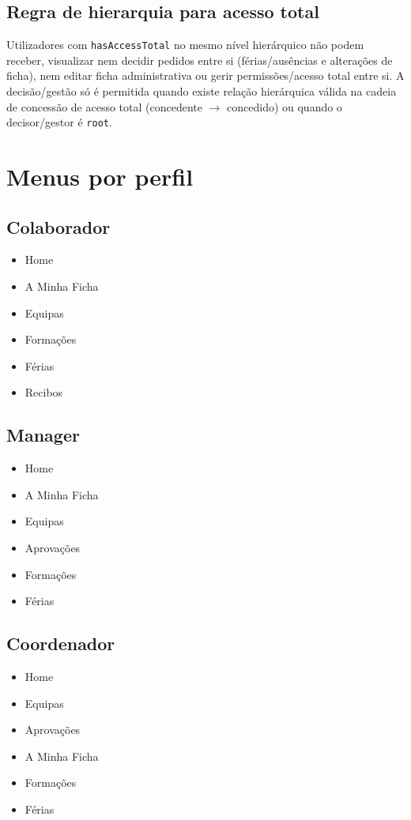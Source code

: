 \documentclass[11pt,a4paper]{article}
\begin{document}
\subsection{Regra de hierarquia para acesso total}

Utilizadores com \texttt{hasAccessTotal} no mesmo nível hierárquico não podem receber, visualizar nem decidir pedidos entre si (férias/ausências e alterações de ficha), nem editar ficha administrativa ou gerir permissões/acesso total entre si. A decisão/gestão só é permitida quando existe relação hierárquica válida na cadeia de concessão de acesso total (concedente $\rightarrow$ concedido) ou quando o decisor/gestor é \texttt{root}.

\section{Menus por perfil}

\subsection{Colaborador}
\begin{itemize}
  \item Home
  \item A Minha Ficha
  \item Equipas
  \item Formações
  \item Férias
  \item Recibos
\end{itemize}

\subsection{Manager}
\begin{itemize}
  \item Home
  \item A Minha Ficha
  \item Equipas
  \item Aprovações
  \item Formações
  \item Férias
\end{itemize}

\subsection{Coordenador}
\begin{itemize}
  \item Home
  \item Equipas
  \item Aprovações
  \item A Minha Ficha
  \item Formações
  \item Férias
\end{itemize}
\end{document}

